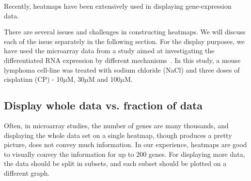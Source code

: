 \documentclass[12pt, oneside, letterpaper]{article}
\begin{document}
Recently, heatmaps have been extensively used in displaying
gene-expression data.

There are several issues and challenges in constructing heatmaps. We
will discuss each of the issue separately in the following
section. For the display purposes, we have used the microarray data
from a study aimed at investigating the differentiated RNA
expression by different mechanisms~\cite{OrigPaper}. In this study,
a mouse lymphoma cell-line was treated with sodium chloride (NaCl)
and three doses of cisplatinn (CP) - 10$\mu$M, 30$\mu$M and 100$\mu$M.

\subsection*{Display whole data vs. fraction of data}
Often, in microarray studies, the number of genes are many
thousands, and displaying the whole data set on a single heatmap,
though produces a pretty picture, does not convey much information.
In our experience, heatmaps are good to visually convey the
information for up to 200 genes. For displaying more data, the data
should be split in subsets, and each subset should be plotted on a
different graph.
\end{document}
